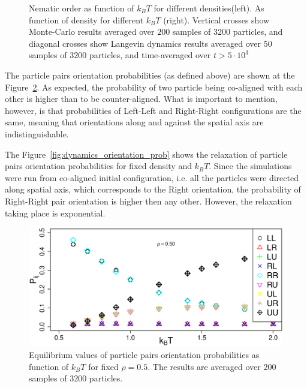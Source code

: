 \documentclass[12pt, a4paper]{article}
\newcommand{\figref}[1]{Figure~\ref{#1}}
\begin{document}
\begin{figure}
\begin{subfigure}{.45\textwidth}
 \end{subfigure}
 \captionsetup{justification=centering, width=0.9\columnwidth}
 \caption{Nematic order as function of $k_BT$ for different densities(left). As function of density for different $k_BT$ (right). Vertical crosses show Monte-Carlo results averaged over $200$ samples of $3200$ particles, and diagonal crosses show Langevin dynamics results averaged over $50$ samples of $3200$ particles, and time-averaged over $t > 5 \cdot 10^3$}
 \label{fig:equilibrium_order_parameter}
\end{figure}

The particle pairs orientation probabilities (as defined above) are shown at the \figref{fig:equilibrium_orientation_prob}. As expected, the probability of two particle being co-aligned with each other is higher than to be counter-aligned. What is important to mention, however, is that probabilities of Left-Left and Right-Right configurations are the same, meaning that orientations along and against the spatial axis are indistinguishable.

The \figref{fig:dynamics_orientation_prob} shows the relaxation of particle pairs orientation probabilities for fixed density and $k_BT$. Since the simulations were run from co-aligned initial configuration, i.e. all the particles were directed along spatial axis, which corresponds to the Right orientation, the probability of Right-Right pair orientation is higher then any other. However, the relaxation taking place is exponential.

\begin{figure}
 \centering
 \includegraphics[width=\textwidth]{Images/particle_probs}
 \captionsetup{justification=centering, width=0.9\columnwidth}
 \caption{Equilibrium values of particle pairs orientation probabilities as function of $k_BT$ for fixed 
 $\rho = 0.5$. The results are averaged over $200$ samples of $3200$ particles.}
 \label{fig:equilibrium_orientation_prob}
\end{figure}
\end{document}
